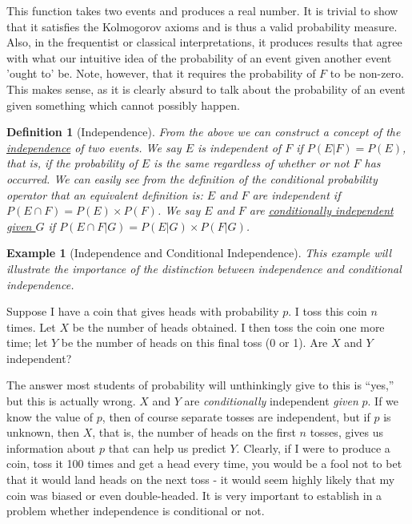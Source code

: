 \documentclass[12pt,a4paper]{article}
\newtheorem{defn}[thm]{Definition}
\newtheorem{ex}[thm]{Example}
\begin{document}
This function takes two events and produces a real number. It is trivial to show that it satisfies the Kolmogorov axioms and is thus a valid probability measure. Also, in the frequentist or classical interpretations, it produces results that agree with what our intuitive idea of the probability of an event given another event 'ought to' be. Note, however, that it requires the probability of $F$ to be non-zero. This makes sense, as it is clearly absurd to talk about the probability of an event given something which cannot possibly happen.

\begin{defn}[Independence]

From the above we can construct a concept of the \underline{independence} of two events. We say $E$ is independent of $F$ if $P(E|F) = P(E)$, that is, if the probability of $E$ is the same regardless of whether or not $F$ has occurred. We can easily see from the definition of the conditional probability operator that an equivalent definition is: $E$ and $F$ are independent if $P(E \cap F) = P(E) \times P(F)$. We say $E$ and $F$ are \underline{conditionally independent given $G$} if $P(E \cap F | G) = P(E|G) \times P(F|G)$.
\end{defn}

\begin{ex}[Independence and Conditional Independence]

This example will illustrate the importance of the distinction between independence and conditional independence.
\end{ex}

Suppose I have a coin that gives heads with probability $p$. I toss this coin $n$ times. Let $X$ be the number of heads obtained. I then toss the coin one more time; let $Y$ be the number of heads on this final toss (0 or 1). Are $X$ and $Y$ independent?

The answer most students of probability will unthinkingly give to this is ``yes,'' but this is actually wrong. $X$ and $Y$ are {\it conditionally} independent {\it given} $p$. If we know the value of $p$, then of course separate tosses are independent, but if $p$ is unknown, then $X$, that is, the number of heads on the first $n$ tosses, gives us information about $p$ that can help us predict $Y$. Clearly, if I were to produce a coin, toss it 100 times and get a head every time, you would be a fool not to bet that it would land heads on the next toss - it would seem highly likely that my coin was biased or even double-headed. It is very important to establish in a problem whether independence is conditional or not.
\end{document}
